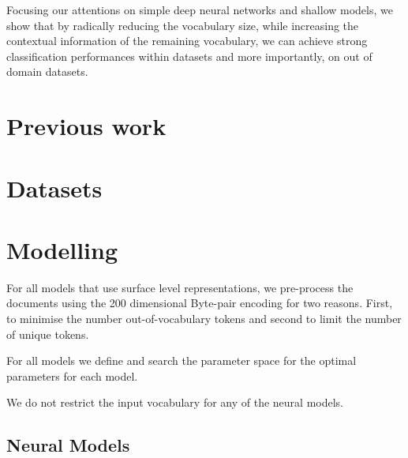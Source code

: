 Focusing our attentions on simple deep neural networks and shallow models, we show that by radically reducing the vocabulary size, while increasing the contextual information of the remaining vocabulary, we can achieve strong classification performances within datasets and more importantly, on out of domain datasets.

\section{Previous work}


\section{Datasets}


\section{Modelling}

For all models that use surface level representations, we pre-process the documents using the 200 dimensional Byte-pair encoding \cite{CITE: BPE paper} for two reasons. First, to minimise the number out-of-vocabulary tokens and second to limit the number of unique tokens. 

For all models we define and search the parameter space for the optimal parameters for each model.

We do not restrict the input vocabulary for any of the neural models.

\subsection{Neural Models}

